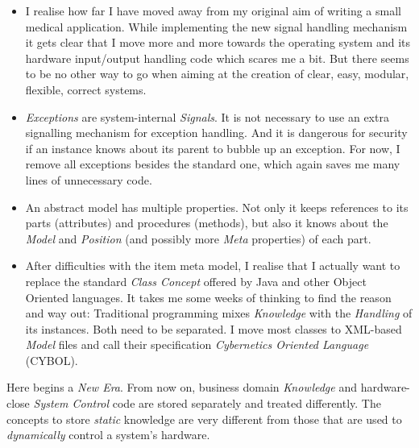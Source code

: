 \begin{itemize}
        \emph{Object}.
    \item[2003] I realise how far I have moved away from my original aim of
        writing a small medical application. While implementing the new signal
        handling mechanism it gets clear that I move more and more towards the
        operating system and its hardware input/output handling code which
        scares me a bit. But there seems to be no other way to go when aiming
        at the creation of clear, easy, modular, flexible, correct systems.
    \item[2003] \emph{Exceptions} are system-internal \emph{Signals}. It is not
        necessary to use an extra signalling mechanism for exception handling.
        And it is dangerous for security if an instance knows about its parent
        to bubble up an exception. For now, I remove all exceptions besides the
        standard one, which again saves me many lines of unnecessary code.
    \item[2003] An abstract model has multiple properties. Not only it keeps
        references to its parts (attributes) and procedures (methods), but also
        it knows about the \emph{Model} and \emph{Position} (and possibly more
        \emph{Meta} properties) of each part.
    \item[2003] After difficulties with the item meta model, I realise that I
        actually want to replace the standard \emph{Class Concept} offered by
        Java and other Object Oriented languages. It takes me some weeks of
        thinking to find the reason and way out: Traditional programming mixes
        \emph{Knowledge} with the \emph{Handling} of its instances. Both need
        to be separated. I move most classes to XML-based \emph{Model} files and
        call their specification \emph{Cybernetics Oriented Language} (CYBOL).
\end{itemize}

Here begins a \emph{New Era}. From now on, business domain \emph{Knowledge}
and hardware-close \emph{System Control} code are stored separately and treated
differently. The concepts to store \emph{static} knowledge are very different
from those that are used to \emph{dynamically} control a system's hardware.

